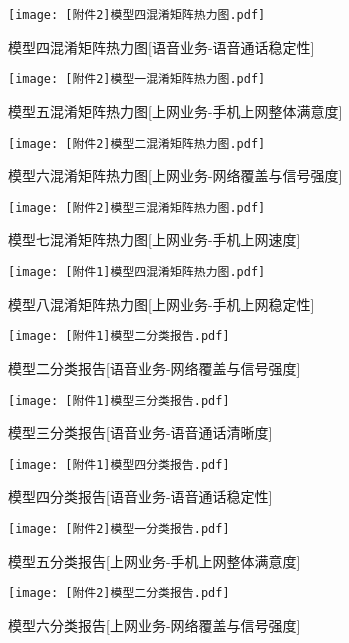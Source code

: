\documentclass{MathorCupmodeling}
\begin{document}
	\begin{figure}[H]
		\centerline{\texttt{[image: [附件2]模型四混淆矩阵热力图.pdf]}}
		\caption{模型四混淆矩阵热力图[语音业务-语音通话稳定性]}\label{fig:FourthModelConfusionMatrix}
	\end{figure}
	\begin{figure}[H]
		\centerline{\texttt{[image: [附件2]模型一混淆矩阵热力图.pdf]}}
		\caption{模型五混淆矩阵热力图[上网业务-手机上网整体满意度]}\label{fig:FifthModelConfusionMatrix}
	\end{figure}
	\begin{figure}[H]
		\centerline{\texttt{[image: [附件2]模型二混淆矩阵热力图.pdf]}}
		\caption{模型六混淆矩阵热力图[上网业务-网络覆盖与信号强度]}\label{fig:SixthModelConfusionMatrix}
	\end{figure}
	\begin{figure}[H]
		\centerline{\texttt{[image: [附件2]模型三混淆矩阵热力图.pdf]}}
		\caption{模型七混淆矩阵热力图[上网业务-手机上网速度]}\label{fig:SeventhModelConfusionMatrix}
	\end{figure}
	\begin{figure}[H]
		\centerline{\texttt{[image: [附件1]模型四混淆矩阵热力图.pdf]}}
		\caption{模型八混淆矩阵热力图[上网业务-手机上网稳定性]}\label{fig:EighthModelConfusionMatrix}
	\end{figure}
	\begin{figure}[H]
		\centerline{\texttt{[image: [附件1]模型二分类报告.pdf]}}
		\caption{模型二分类报告[语音业务-网络覆盖与信号强度]}\label{fig:SecondModelClassificationReport}
	\end{figure}
	\begin{figure}[H]
		\centerline{\texttt{[image: [附件1]模型三分类报告.pdf]}}
		\caption{模型三分类报告[语音业务-语音通话清晰度]}\label{fig:ThirdModelClassificationReport}
	\end{figure}
	\begin{figure}[H]
		\centerline{\texttt{[image: [附件1]模型四分类报告.pdf]}}
		\caption{模型四分类报告[语音业务-语音通话稳定性]}\label{fig:FourthModelClassificationReport}
	\end{figure}
	\begin{figure}[H]
		\centerline{\texttt{[image: [附件2]模型一分类报告.pdf]}}
		\caption{模型五分类报告[上网业务-手机上网整体满意度]}\label{fig:FifthModelClassificationReport}
	\end{figure}
	\begin{figure}[H]
		\centerline{\texttt{[image: [附件2]模型二分类报告.pdf]}}
		\caption{模型六分类报告[上网业务-网络覆盖与信号强度]}\label{fig:SixthModelClassificationReport}
	\end{figure}
\end{document}
